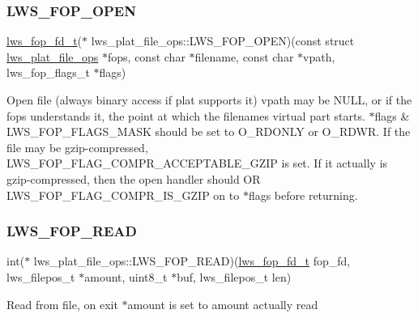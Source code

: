 \subsubsection{\texorpdfstring{L\+W\+S\+\_\+\+F\+O\+P\+\_\+\+O\+P\+EN}{LWS\_FOP\_OPEN}}
{\footnotesize\ttfamily \hyperlink{structlws__fop__fd}{lws\+\_\+fop\+\_\+fd\+\_\+t}($\ast$ lws\+\_\+plat\+\_\+file\+\_\+ops\+::\+L\+W\+S\+\_\+\+F\+O\+P\+\_\+\+O\+P\+EN)(const struct \hyperlink{structlws__plat__file__ops}{lws\+\_\+plat\+\_\+file\+\_\+ops} $\ast$fops, const char $\ast$filename, const char $\ast$vpath, lws\+\_\+fop\+\_\+flags\+\_\+t $\ast$flags)}

Open file (always binary access if plat supports it) vpath may be N\+U\+LL, or if the fops understands it, the point at which the filename\textquotesingle{}s virtual part starts. $\ast$flags \& L\+W\+S\+\_\+\+F\+O\+P\+\_\+\+F\+L\+A\+G\+S\+\_\+\+M\+A\+SK should be set to O\+\_\+\+R\+D\+O\+N\+LY or O\+\_\+\+R\+D\+WR. If the file may be gzip-\/compressed, L\+W\+S\+\_\+\+F\+O\+P\+\_\+\+F\+L\+A\+G\+\_\+\+C\+O\+M\+P\+R\+\_\+\+A\+C\+C\+E\+P\+T\+A\+B\+L\+E\+\_\+\+G\+Z\+IP is set. If it actually is gzip-\/compressed, then the open handler should OR L\+W\+S\+\_\+\+F\+O\+P\+\_\+\+F\+L\+A\+G\+\_\+\+C\+O\+M\+P\+R\+\_\+\+I\+S\+\_\+\+G\+Z\+IP on to $\ast$flags before returning. \mbox{\label{structlws__plat__file__ops_aae5f22fbf335e6d4294b96c8b4e3b707}} 
\subsubsection{\texorpdfstring{L\+W\+S\+\_\+\+F\+O\+P\+\_\+\+R\+E\+AD}{LWS\_FOP\_READ}}
{\footnotesize\ttfamily int($\ast$ lws\+\_\+plat\+\_\+file\+\_\+ops\+::\+L\+W\+S\+\_\+\+F\+O\+P\+\_\+\+R\+E\+AD)(\hyperlink{structlws__fop__fd}{lws\+\_\+fop\+\_\+fd\+\_\+t} fop\+\_\+fd, lws\+\_\+filepos\+\_\+t $\ast$amount, uint8\+\_\+t $\ast$buf, lws\+\_\+filepos\+\_\+t len)}

Read from file, on exit $\ast$amount is set to amount actually read \mbox{\label{structlws__plat__file__ops_a9e073286e9b14b28cff6331abb56293c}} 
